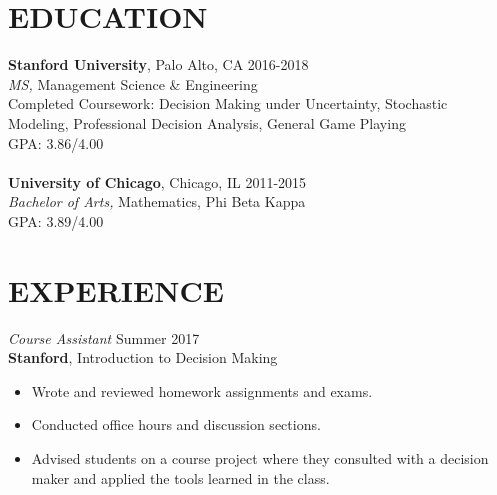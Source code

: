 \documentclass[margin, 10pt]{res} %
\begin{document}
\begin{resume}

% 
%


\section{EDUCATION}

\textbf{Stanford University}, Palo Alto, CA \hfill 2016-2018 \\
{\sl MS,} Management Science \& Engineering \\
Completed Coursework: Decision Making under Uncertainty, Stochastic Modeling, Professional Decision Analysis, General Game Playing \\
GPA: 3.86/4.00 \\\\
\textbf{University of Chicago}, Chicago, IL \hfill 2011-2015 \\
{\sl Bachelor of Arts,} Mathematics, Phi Beta Kappa \\
GPA: 3.89/4.00
 
 
\section{EXPERIENCE}

{\sl Course Assistant} \hfill Summer 2017 \\
\textbf{Stanford}, Introduction to Decision Making
\begin{itemize} \itemsep -2pt %
	\item Wrote and reviewed homework assignments and exams. 
	\item Conducted office hours and discussion sections. 
	\item Advised students on a course project where they consulted with a decision maker and applied the tools learned in the class. 
\end{itemize}


\end{resume}
\end{document}
